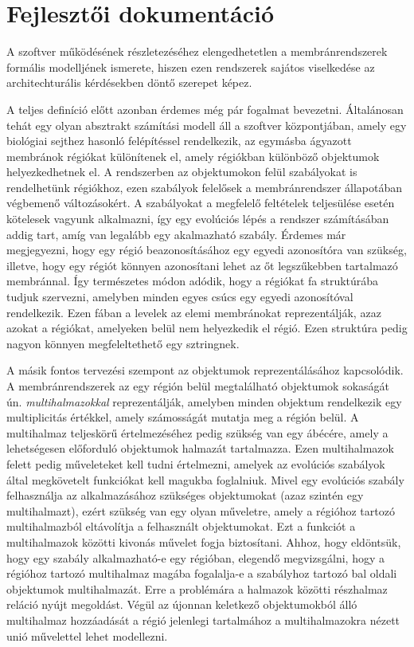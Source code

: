 \chapter{Fejlesztői dokumentáció}
\label{ch:impl}

A szoftver működésének részletezéséhez elengedhetetlen a membránrendszerek formális modelljének ismerete, hiszen ezen rendszerek sajátos viselkedése az architechturális kérdésekben döntő szerepet képez.

A teljes definíció előtt azonban érdemes még pár fogalmat bevezetni. Általánosan tehát egy olyan absztrakt számítási modell áll a szoftver központjában, amely egy biológiai sejthez hasonló felépítéssel rendelkezik, az egymásba ágyazott membránok régiókat különítenek el, amely régiókban különböző objektumok helyezkedhetnek el. A rendszerben az objektumokon felül szabályokat is rendelhetünk régiókhoz, ezen szabályok felelősek a membránrendszer állapotában végbemenő változásokért. A szabályokat a megfelelő feltételek teljesülése esetén kötelesek vagyunk alkalmazni, így egy evolúciós lépés a rendszer számításában addig tart, amíg van legalább egy akalmazható szabály. Érdemes már megjegyezni, hogy egy régió beazonosításához egy egyedi azonosítóra van szükség, illetve, hogy egy régiót könnyen azonosítani lehet az őt legszűkebben tartalmazó membránnal. Így természetes módon adódik, hogy a régiókat fa struktúrába tudjuk szervezni, amelyben minden egyes csúcs egy egyedi azonosítóval rendelkezik. Ezen fában a levelek az elemi membránokat reprezentálják, azaz azokat a régiókat, amelyeken belül nem helyezkedik el régió.  Ezen struktúra pedig nagyon könnyen megfeleltethető egy sztringnek.

A másik fontos tervezési szempont az objektumok reprezentálásához kapcsolódik. A membránrendszerek az egy régión belül megtalálható objektumok sokaságát ún. \textit{multihalmazokkal} reprezentálják, amelyben minden objektum rendelkezik egy multiplicitás értékkel, amely számosságát mutatja meg a régión belül. A multihalmaz teljeskörű értelmezéséhez pedig szükség van egy ábécére, amely a lehetségesen előforduló objektumok halmazát tartalmazza. Ezen multihalmazok felett pedig műveleteket kell tudni értelmezni, amelyek az evolúciós szabályok által megkövetelt funkciókat kell magukba foglalniuk. Mivel egy evolúciós szabály felhasználja az alkalmazásához szükséges objektumokat (azaz szintén egy multihalmazt), ezért szükség van egy olyan műveletre, amely a régióhoz tartozó multihalmazból eltávolítja a felhasznált objektumokat. Ezt a funkciót a multihalmazok közötti kivonás művelet fogja biztosítani. Ahhoz, hogy eldöntsük, hogy egy szabály alkalmazható-e egy régióban, elegendő megvizsgálni, hogy a régióhoz tartozó multihalmaz magába fogalalja-e a szabályhoz tartozó bal oldali objektumok multihalmazát. Erre a problémára a halmazok közötti részhalmaz reláció nyújt megoldást. Végül az újonnan keletkező objektumokból álló multihalmaz hozzáadását a régió jelenlegi tartalmához a multihalmazokra nézett unió művelettel lehet modellezni. 

